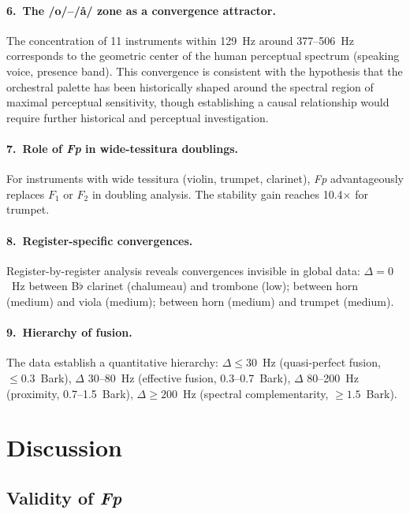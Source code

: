 \documentclass[12pt,a4paper]{article}
\begin{document}
\paragraph{6.\ The /o/--/\aa/ zone as a convergence attractor.}
The concentration of 11 instruments within 129~Hz around 377--506~Hz corresponds
to the geometric center of the human perceptual spectrum (speaking voice,
presence band). This convergence is consistent with the hypothesis that the
orchestral palette has been historically shaped around the spectral region of
maximal perceptual sensitivity, though establishing a causal relationship would
require further historical and perceptual investigation.

\paragraph{7.\ Role of \textit{Fp} in wide-tessitura doublings.}
For instruments with wide tessitura (violin, trumpet, clarinet), \textit{Fp}
advantageously replaces $F_1$ or $F_2$ in doubling analysis. The stability gain
reaches 10.4$\times$ for trumpet.

\paragraph{8.\ Register-specific convergences.}
Register-by-register analysis reveals convergences invisible in global data:
$\Delta = 0$~Hz between B$\flat$ clarinet (chalumeau) and trombone (low);
between horn (medium) and viola (medium); between horn (medium) and trumpet
(medium).

\paragraph{9.\ Hierarchy of fusion.}
The data establish a quantitative hierarchy: $\Delta \leq 30$~Hz (quasi-perfect
fusion, $\leq 0.3$~Bark), $\Delta$ 30--80~Hz (effective fusion, 0.3--0.7~Bark),
$\Delta$ 80--200~Hz (proximity, 0.7--1.5~Bark), $\Delta \geq 200$~Hz
(spectral complementarity, $\geq 1.5$~Bark).

\section{Discussion}

\subsection{Validity of \textit{Fp}}
\end{document}
